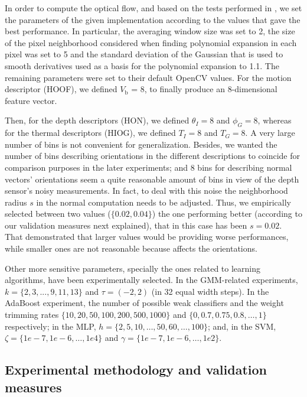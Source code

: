 \documentclass[10pt,twocolumn,letterpaper]{article}
\begin{document}
In order to compute the optical flow, and based on the tests performed in \cite{brkic2013combining}, we set the parameters of the given implementation according to the values that gave the best performance. In particular, the averaging window size was set to 2, the size of the pixel neighborhood considered when finding polynomial expansion in each pixel was set to 5 and the standard deviation of the Gaussian that is used to smooth derivatives used as a basis for the polynomial expansion to 1.1.  The remaining parameters were set to their default OpenCV values. For the motion descriptor (HOOF), we defined $V_\text{b}$ = 8, to finally produce an 8-dimensional feature vector. 

Then, for the depth descriptors (HON), we defined $\theta_{I} = 8$ and $\phi_{G} = 8$, whereas for the thermal descriptors (HIOG), we defined $T_{I} = 8$ and $T_{G} = 8$. A very large number of bins is not convenient for generalization. Besides, we wanted the number of bins describing orientations in the different descriptions to coincide for comparison purposes in the later experiments; and 8 bins for describing normal vectors' orientations seem a quite reasonable amount of bins in view of the depth sensor's noisy measurements. In fact, to deal with this noise the neighborhood radius $s$ in the normal computation needs to be adjusted. Thus, we empirically selected between two values ($\{0.02, 0.04\}$) the one performing better (according to our validation measures next explained), that in this case has been $s = 0.02$. That demonstrated that larger values would be providing worse performances, while smaller ones are not reasonable because affects the orientations.

Other more sensitive parameters, specially the ones related to learning algorithms, have been experimentally selected. In the GMM-related experiments, $k = \{2,3, ..., 9, 11, 13\}$ and $\tau = (-2,2)$ (in 32 equal width steps). In the AdaBoost experiment, the number of possible weak classifiers and the weight trimming rates  $\{10, 20, 50, 100, 200, 500, 1000\}$ and $\{0, 0.7, 0.75, 0.8, \ldots, 1\}$ respectively; in the MLP, $h = \{2, 5, 10, \ldots, 50, 60, \ldots, 100\}$; and, in the SVM, $\zeta = \{1e-7, 1e-6, \ldots, 1e4\}$ and $\gamma = \{1e-7, 1e-6, \ldots, 1e2\}$.


\subsection{Experimental methodology and validation measures}
\label{ssec:validation}
\end{document}
